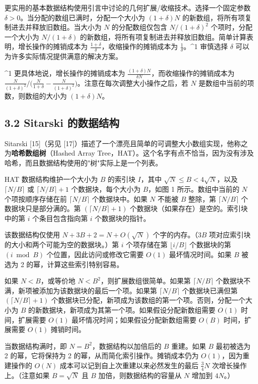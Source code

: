\documentclass[12pt,a4paper]{ctexart}
\theoremstyle{remark}
\begin{document}
更实用的基本数据结构使用引言中讨论的几何扩展/收缩技术。选择一个固定参数 $\delta>0$。当分配的数组已满时，分配一个大小为 $(1+\delta)N$ 的新数组，将所有项复制进去并释放旧数组。当大小为 $N$ 的分配数组仅包含 $N/(1+\delta)^2$ 个项时，分配一个大小为 $N/(1+\delta)$ 的新数组，将所有项复制进去并释放旧数组。简单计算表明，增长操作的摊销成本为 $\frac{1+\delta}{\delta}$，收缩操作的摊销成本为 $\frac{1}{\delta}$。^1 审慎选择 $\delta$ 可以为许多实际情况提供满意的解决方案。

^1 更具体地说，增长操作的摊销成本为 $\frac{(1+\delta)N}{\delta N}$，而收缩操作的摊销成本为 $\frac{N}{(1+\delta)^2}\Big/\big(\frac{N}{1+\delta}-\frac{N}{(1+\delta)^2}\big)$。注意在每次调整大小操作之后，若 $N$ 是数组中当前的项数，则数组的大小为 $(1+\delta)N$。

\subsection{3.2 Sitarski 的数据结构}

Sitarski [15]（另见 [17]）描述了一个漂亮且简单的可调整大小数组实现，他称之为\textbf{哈希数组树}（Hashed Array Tree，HAT）。这个名字有点不恰当，因为没有涉及哈希，而且数据结构使用的"树"实际上是一个列表。

HAT 数据结构维护一个大小为 $B$ 的索引块 $I$，其中 $\sqrt{N}\leq B<4\sqrt{N}$，以及 $\lceil N/B\rceil$ 或 $\lceil N/B\rceil+1$ 个数据块，每个大小为 $B$，如图 1 所示。数组中当前的 $N$ 个项按顺序存储在前 $\lceil N/B\rceil$ 个数据块中。如果 $N$ 不能被 $B$ 整除，第 $\lceil N/B\rceil$ 个数据块只是部分满的。第 $(\lceil N/B\rceil+1)$ 个数据块（如果存在）是空的。索引块中的第 $i$ 个条目包含指向第 $i$ 个数据块的指针。

该数据结构仅使用 $N+3B+2=N+O(\sqrt{N})$ 个字的内存。（$3B$ 项对应索引块的大小和两个可能为空的数据块。）第 $i$ 个项存储在第 $\lfloor i/B\rfloor$ 个数据块的第 $(i\bmod B)$ 个位置，因此访问或修改它需要 $O(1)$ 最坏情况时间。如果 $B$ 被选为 2 的幂，计算这些索引特别容易。

如果 $N<B$，或等价地 $N<B^2$，则扩展数组很简单。如果第 $\lceil N/B\rceil$ 个数据块不满，新项被添加为该数据块的最后一个项。如果第 $\lceil N/B\rceil$ 个数据块已满但第 $(\lceil N/B\rceil+1)$ 个数据块已分配，新项成为该数组的第一个项。否则，分配一个大小为 $B$ 的新数据块，新项成为其第一个项。如果假设分配新数组需要 $O(1)$ 时间，扩展需要 $O(1)$ 最坏情况时间；如果假设分配新数组需要 $O(B)$ 时间，扩展需要 $O(1)$ 摊销时间。

当数据结构满时，即 $N=B^2$，数据结构以加倍后的 $B$ 重建。如果 $B$ 最初被选为 2 的幂，它将保持为 2 的幂，从而简化索引操作。摊销成本仍为 $O(1)$，因为重建操作的 $O(N)$ 成本可以记到自上次重建以来必然发生的最后 $\frac{3}{4}N$ 次增长操作上。（注意如果 $B=\sqrt{N}$ 且 $B$ 加倍，则数据结构的容量从 $N$ 增加到 $4N$。）
\end{document}

